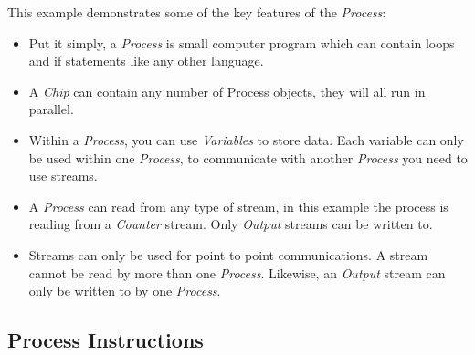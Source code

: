 \documentclass[letterpaper,10pt,english]{manual}
\begin{document}
This example demonstrates some of the key features of the \emph{Process}:
\begin{itemize}
\item {} 
Put it simply, a \emph{Process} is small computer program which can contain loops
and if statements like any other language.

\item {} 
A \emph{Chip} can contain any number of Process objects, they will all run in
parallel.

\item {} 
Within a \emph{Process}, you can use \emph{Variables} to store data. Each variable can
only be used within one \emph{Process}, to communicate with another \emph{Process} you
need to use streams.

\item {} 
A \emph{Process} can read from any type of stream, in this example the process is
reading from a \emph{Counter} stream. Only \emph{Output} streams can be written to.

\item {} 
Streams can only be used for point to point communications. A stream cannot
be read by more than one \emph{Process}. Likewise, an \emph{Output} stream can only be
written to by one \emph{Process}.

\end{itemize}


\subsection{Process Instructions}
\end{document}
